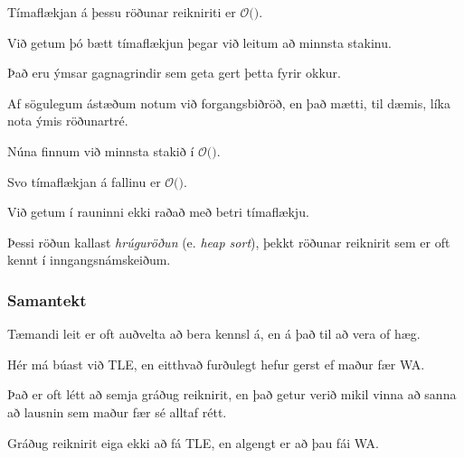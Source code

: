 {
}

{
	{
		\item<1-> Tímaflækjan á þessu röðunar reikniriti er $\mathcal{O}($\onslide<2->{$n^2$}$)$.
		\item<3-> Við getum þó bætt tímaflækjun þegar við leitum að minnsta stakinu.
		\item<4-> Það eru ýmsar gagnagrindir sem geta gert þetta fyrir okkur.
		\item<5-> Af sögulegum ástæðum notum við forgangsbiðröð, en það mætti, til dæmis, líka nota ýmis röðunartré.
	}
}

{
}

{
	{
		\item<1-> Núna finnum við minnsta stakið í $\mathcal{O}($\onslide<2->{$\log n$}$)$.
		\item<3-> Svo tímaflækjan á fallinu er $\mathcal{O}($\onslide<4->{$n \log n$}$)$.
		\item<5-> Við getum í rauninni ekki raðað með betri tímaflækju.
		\item<6-> Þessi röðun kallast \emph{hrúguröðun} (e. \emph{heap sort}), þekkt röðunar reiknirit sem er oft kennt í inngangsnámskeiðum.
	}
}

{
	\frametitle{Samantekt}
	{
		\item<1-> Tæmandi leit er oft auðvelta að bera kennsl á, en á það til að vera of hæg. 
		\item<2-> Hér má búast við TLE, en eitthvað furðulegt hefur gerst ef maður fær WA.
		\item<3-> Það er oft létt að semja gráðug reiknirit, en það getur verið mikil vinna að sanna að lausnin sem maður fær sé alltaf rétt.
		\item<4-> Gráðug reiknirit eiga ekki að fá TLE, en algengt er að þau fái WA.
	}
}

{
}


